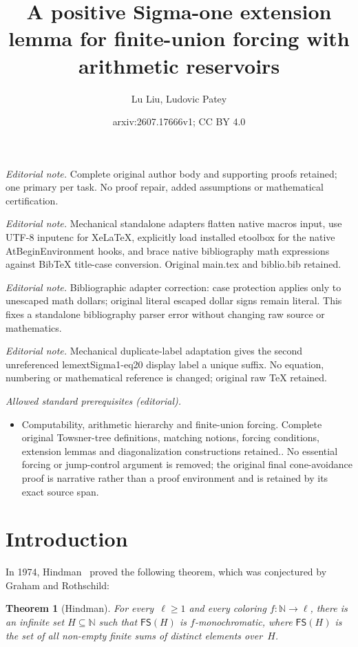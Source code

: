 \documentclass[10pt,a4paper]{article}
\title{A positive Sigma-one extension lemma for finite-union forcing with arithmetic reservoirs}
\author{Lu Liu, Ludovic Patey}
\date{arxiv:2607.17666v1; CC BY 4.0}
\newcommand{\NN}[0]{\mathbb{N}}
\newcommand{\FS}[0]{\mathsf{FS}} %
\newtheorem{theorem}{Theorem}
\numberwithin{theorem}{section}
\begin{document}
\maketitle
\noindent\textit{Editorial note.} Complete original author body and supporting proofs retained; one primary per task. No proof repair, added assumptions or mathematical certification.\par\medskip
\noindent\textit{Editorial note.} Mechanical standalone adapters flatten native macros input, use UTF-8 inputenc for XeLaTeX, explicitly load installed etoolbox for the native AtBeginEnvironment hooks, and brace native bibliography math expressions against BibTeX title-case conversion. Original main.tex and biblio.bib retained.\par\medskip
\noindent\textit{Editorial note.} Bibliographic adapter correction: case protection applies only to unescaped math dollars; original literal escaped dollar signs remain literal. This fixes a standalone bibliography parser error without changing raw source or mathematics.\par\medskip
\noindent\textit{Editorial note.} Mechanical duplicate-label adaptation gives the second unreferenced lemextSigma1-eq20 display label a unique suffix. No equation, numbering or mathematical reference is changed; original raw TeX retained.\par\medskip
\noindent\textit{Allowed standard prerequisites (editorial).}\begin{itemize}
\item Computability, arithmetic hierarchy and finite-union forcing. Complete original Towsner-tree definitions, matching notions, forcing conditions, extension lemmas and diagonalization constructions retained.. No essential forcing or jump-control argument is removed; the original final cone-avoidance proof is narrative rather than a proof environment and is retained by its exact source span.
\end{itemize}\medskip
\section{Introduction}

In 1974, Hindman~\cite{hindmanFiniteSumsSequences1974} proved the following theorem, which was conjectured by Graham and Rothschild:

\begin{theorem}[Hindman]
For every~$\ell \geq 1$ and every coloring $f : \NN \to \ell$, there is an infinite set $H \subseteq \NN$ such that $\FS(H)$ is $f$-monochromatic, where $\FS(H)$ is the set of all non-empty finite sums of distinct elements over~$H$.
\end{theorem}
\end{document}
